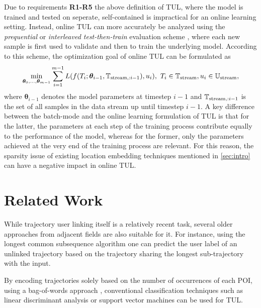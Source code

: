 \documentclass{article} %
\theoremstyle{definition}
\begin{document}
Due to requirements \textbf{R1-R5} the above definition of TUL, where the model is trained and tested on seperate, self-contained is impractical for an online learning setting.
Instead, online TUL can more accurately be analyzed using the \textit{prequential} or \textit{interleaved test-then-train} evaluation scheme \citep{bifetMOAMassiveOnline2010}, where each new sample is first used to validate and then to train the underlying model.
According to this scheme, the optimization goal of online TUL can be formulated as
\begin{equation} %
    \min_{\bm{\theta}_0, ..., \bm{\theta}_{m-1}} \sum_{i=1}^{m-1} L(f(T_{i}; \bm{\theta}_{i-1}, \sT_{\textrm{stream},:i-1}), u_{i}), \ T_i \in \sT_{\textrm{stream}}, u_i \in \sU_{\textrm{stream}},
\end{equation}
where $\bm{\theta}_{i-1}$ denotes the model parameters at timestep $i-1$ and ${\mathbb{T}}_{\textrm{stream},:i-1}$ is the set of all samples in the data stream up until timestep $i-1$.
A key difference between the batch-mode and the online learning formulation of TUL is that for the latter, the parameters at each step of the training process contribute equally to the performance of the model, whereas for the former, only the parameters achieved at the very end of the training process are relevant.
For this reason, the sparsity issue of existing location embedding techniques mentioned in \ref{sec:intro} can have a negative impact in online TUL.


\section{Related Work}

While trajectory user linking itself is a relatively recent task, several older approaches from adjacent fields are also suitable for it.
For instance, using the longest common subsequence algorithm \citep{yingSemanticTrajectoryMining2011} one can predict the user label of an unlinked trajectory based on the trajectory sharing the longest sub-trajectory with the input.

By encoding trajectories solely based on the number of occurrences of each POI, using a bag-of-words approach \citep{mikolovEfficientEstimationWord2013}, conventional classification techniques such as linear discriminant analysis or support vector machines can be used for TUL.
\end{document}
